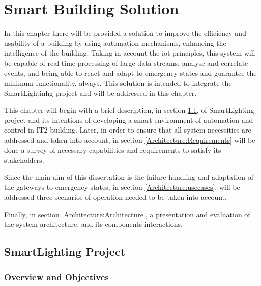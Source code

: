 \chapter{Smart Building Solution}
\label{chapter:architecture}

In this chapter there will be provided a solution to improve the efficiency and usability of a building by using automation mechanisms, enhancing the intelligence of the building. Taking in account the \ac{iot} principles, this system will be capable of real-time processing of large data streams, analyse and correlate events, and being able to react and adapt to emergency states and guarantee the minimum functionality, always. This solution is intended to integrate the SmartLightinhg project and will be addressed in this chapter.

This chapter will begin with a brief description, in section \ref{Architecture:slproject}, of SmartLighting project and its intentions of developing a smart environment of automation and control in IT2 building. Later, in order to ensure that all system necessities are addressed and taken into account, in section \ref{Architecture:Requirements} will be done a survey of necessary capabilities and  requirements to satisfy its stakeholders.

Since the main aim of this dissertation is the failure handling and adaptation of the gateways to emergency states, in section \ref{Architecture:usecases}, will be addressed three scenarios of operation needed to be taken into account.

Finally, in section \ref{Architecture:Architecture}, a presentation and evaluation of the system architecture, and its components interactions. 


\newpage


\iffalse
********************************




********************************

\fi




\section{SmartLighting Project}
\label{Architecture:slproject}

\subsection{Overview and Objectives}
\label{Architecture:Overview}

